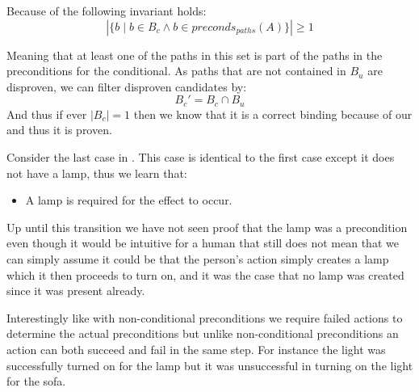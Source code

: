 \documentclass[\master/Master.tex]{subfiles}
\begin{document}
Because of  the following invariant holds:
\begin{equation} \label{eq:binding_invariant}
\left| \{b  \mid  b \in B_c \land b \in preconds_{paths}(A)\} \right|  \ge 1
\end{equation}


Meaning that at least one of the paths in this set is part of the paths in the preconditions for the conditional. As paths that are not contained in $B_u$ are disproven, we can filter disproven candidates by:
\begin{equation}
    B_c' = B_c \cap B_u
\end{equation}
And thus if ever $|B_c| = 1$ then we know that it is a correct binding because of our  and thus it is proven.

\begin{example}\label{ex:ca:light-on-3}
    Consider the last case in . This case is identical to the first case except it does not have a lamp, thus we learn that:
    \begin{itemize}
        \item A lamp is required for the effect to occur.
    \end{itemize}
    Up until this transition we have not seen proof that the lamp was a precondition even though it would be intuitive for a human that still does not mean that we can simply assume it could be that the person's action simply creates a lamp which it then proceeds to turn on, and it was the case that no lamp was created since it was present already.
    
    Interestingly like with non-conditional preconditions we require failed actions to determine the actual preconditions but unlike non-conditional preconditions an action can both succeed and fail in the same step. For instance the light was successfully turned on for the lamp but it was unsuccessful in turning on the light for the sofa.

\end{example}
\end{document}
